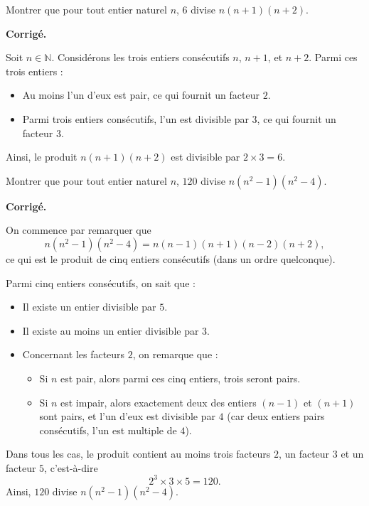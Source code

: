 \documentclass[a4paper,11pt]{article}
\title{
\centering
\tcbset{colframe=BlackSav,colback=GrayBG}
\tcbox[tikznode]{
Chapitre 5 \\ PGCD et applications
}
}
\author{}
\date{}
\newenvironment{corrige}[1][Corrigé]{%
  \par\noindent\textbf{#1.}%
  \begin{itshape}}%
  {\end{itshape}\par}
\begin{document}
\begin{exercice}[title=Exercice 20 $\quad \star \quad$ { [Calculer, Raisonner] }]{}{}
Montrer que pour tout entier naturel $n$, $6$ divise $n(n+1)(n+2)$.
\end{exercice}

\begin{corrige}
Soit $n\in \mathbb{N}$. Considérons les trois entiers consécutifs $n$, $n+1$, et $n+2$. Parmi ces trois entiers :
\begin{itemize}
    \item Au moins l’un d’eux est pair, ce qui fournit un facteur $2$.
    \item Parmi trois entiers consécutifs, l’un est divisible par $3$, ce qui fournit un facteur $3$.
\end{itemize}
Ainsi, le produit $n(n+1)(n+2)$ est divisible par $2 \times 3 = 6$.
\end{corrige}

\begin{exercice}[title=Exercice 21 $\quad \star \quad$ { [Calculer, Raisonner] }]{}{}
Montrer que pour tout entier naturel $n$, $120$ divise $n(n^2-1)(n^2-4)$.
\end{exercice}

\begin{corrige}
On commence par remarquer que
\[
n(n^2-1)(n^2-4) = n (n-1)(n+1)(n-2)(n+2),
\]
ce qui est le produit de cinq entiers consécutifs (dans un ordre quelconque).

Parmi cinq entiers consécutifs, on sait que :
\begin{itemize}
    \item Il existe un entier divisible par $5$.
    \item Il existe au moins un entier divisible par $3$.
    \item Concernant les facteurs $2$, on remarque que :
    \begin{itemize}
        \item Si $n$ est pair, alors parmi ces cinq entiers, trois seront pairs.
        \item Si $n$ est impair, alors exactement deux des entiers $(n-1)$ et $(n+1)$ sont pairs, et l’un d’eux est divisible par $4$ (car deux entiers pairs consécutifs, l’un est multiple de $4$).
    \end{itemize}
\end{itemize}
Dans tous les cas, le produit contient au moins trois facteurs $2$, un facteur $3$ et un facteur $5$, c'est-à-dire
\[
2^3\times 3\times 5 = 120.
\]
Ainsi, $120$ divise $n(n^2-1)(n^2-4)$.
\end{corrige}
\end{document}
